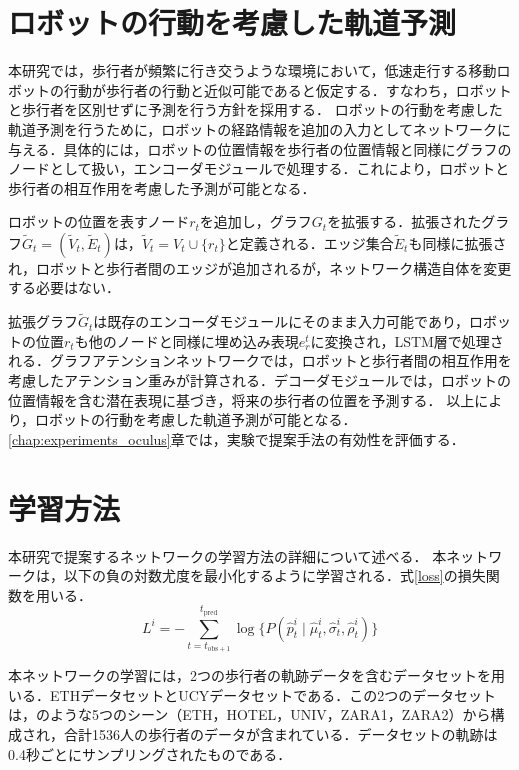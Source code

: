 \section{ロボットの行動を考慮した軌道予測}
本研究では，歩行者が頻繁に行き交うような環境において，低速走行する移動ロボットの行動が歩行者の行動と近似可能であると仮定する．すなわち，ロボットと歩行者を区別せずに予測を行う方針を採用する．
ロボットの行動を考慮した軌道予測を行うために，ロボットの経路情報を追加の入力としてネットワークに与える．具体的には，ロボットの位置情報を歩行者の位置情報と同様にグラフのノードとして扱い，エンコーダモジュールで処理する．これにより，ロボットと歩行者の相互作用を考慮した予測が可能となる．

ロボットの位置を表すノード$r_t$を追加し，グラフ$G_t$を拡張する．拡張されたグラフ$\tilde{G}_t = (\tilde{V}_t, \tilde{E}_t)$は，$\tilde{V}_t = V_t \cup \{ r_t \}$と定義される．エッジ集合$\tilde{E}_t$も同様に拡張され，ロボットと歩行者間のエッジが追加されるが，ネットワーク構造自体を変更する必要はない．

拡張グラフ$\tilde{G}_t$は既存のエンコーダモジュールにそのまま入力可能であり，ロボットの位置$r_t$も他のノードと同様に埋め込み表現$e^t_r$に変換され，LSTM層で処理される．グラフアテンションネットワークでは，ロボットと歩行者間の相互作用を考慮したアテンション重みが計算される．デコーダモジュールでは，ロボットの位置情報を含む潜在表現に基づき，将来の歩行者の位置を予測する．
以上により，ロボットの行動を考慮した軌道予測が可能となる．\ref{chap:experiments_oculus}章では，実験で提案手法の有効性を評価する．

\vspace{-5pt}
\section{学習方法}\label{sec:learning-method}
本研究で提案するネットワークの学習方法の詳細について述べる．
本ネットワークは，以下の負の対数尤度を最小化するように学習される．式\eqref{loss}の損失関数を用いる．
\begin{equation}
  L^i = -\sum_{t=t_{\text{obs}+1}}^{t_{\text{pred}}} \log \{ P(\hat{p}^i_t \mid \hat{\mu}^i_t, \hat{\sigma}^i_t, \hat{\rho}^i_t) \} \label{loss}
\end{equation}

本ネットワークの学習には，2つの歩行者の軌跡データを含むデータセットを用いる．ETHデータセット\cite{pellegrini2009you-eth}とUCYデータセット\cite{lerner2007crowds-ucy}である．この2つのデータセットは，のような5つのシーン（ETH，HOTEL，UNIV，ZARA1，ZARA2）から構成され，合計1536人の歩行者のデータが含まれている．データセットの軌跡は0.4秒ごとにサンプリングされたものである．


